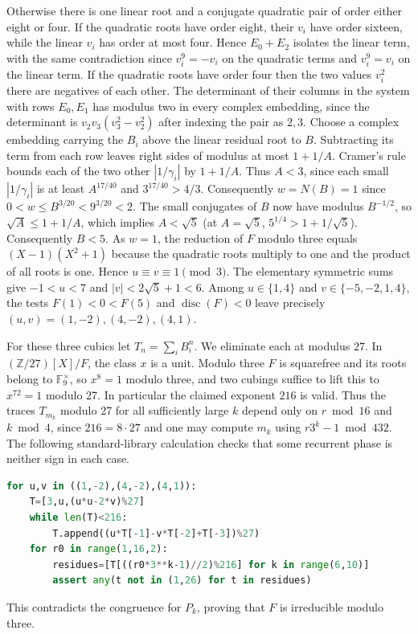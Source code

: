\documentclass[11pt]{article}
\begin{document}
Otherwise there is one linear root and a conjugate quadratic pair of
order either eight or four. If the quadratic roots have order eight,
their $v_i$ have order sixteen, while the linear $v_i$ has order at
most four. Hence $E_0+E_2$ isolates the linear term, with the same
contradiction since $v_i^9=-v_i$ on the quadratic terms and $v_i^9=v_i$ on the linear term. If the quadratic roots have order four then the two
values $v_i^2$ there are negatives of each other. The determinant of
their columns in the system with rows $E_0,E_1$ has modulus two
in every complex embedding, since the determinant is $v_2v_3(v_3^2-v_2^2)$ after indexing the pair as $2,3$. Choose a complex embedding carrying the $B_i$ above the linear residual root to $B$. Subtracting its term from each row leaves right sides of modulus at most $1+1/A$. Cramer's rule
bounds each of the two other $|1/\gamma_i|$ by $1+1/A$.
Thus $A<3$, since each small $|1/\gamma_i|$ is at least $A^{17/40}$
and $3^{17/40}>4/3$. Consequently $w=N(B)=1$ since
$0<w\le B^{3/20}<9^{3/20}<2$. The small conjugates
of $B$ now have modulus $B^{-1/2}$, so $\sqrt A\le1+1/A$, which implies $A<\sqrt5$ (at $A=\sqrt5$, $5^{1/4}>1+1/\sqrt5$).
Consequently $B<5$. As $w=1$, the reduction of $F$ modulo three equals
$(X-1)(X^2+1)$ because the quadratic roots multiply to one and the
product of all roots is one. Hence $u\equiv v\equiv1\pmod3$.
The elementary symmetric sums give $-1<u<7$ and
$|v|<2\sqrt5+1<6$. Among $u\in\{1,4\}$ and
$v\in\{-5,-2,1,4\}$, the tests $F(1)<0<F(5)$ and
$\operatorname{disc}(F)<0$ leave precisely
$(u,v)=(1,-2),(4,-2),(4,1)$.

For these three cubics let $T_n=\sum_i B_i^n$. We eliminate each at modulus $27$. In $(\mathbb Z/27)[X]/F$, the
class $x$ is a unit. Modulo three $F$ is squarefree
and its roots belong to $\mathbb F_9^\times$, so $x^8=1$ modulo
three, and two cubings suffice to lift this to $x^{72}=1$ modulo
27. In particular the claimed exponent $216$ is valid. Thus the
traces $T_{m_k}$ modulo 27 for all sufficiently large $k$ depend
only on $r\bmod16$ and $k\bmod4$, since $216=8\cdot27$ and one may
compute $m_k$ using $r3^k-1\bmod432$. The following standard-library
calculation checks that some recurrent phase is neither sign in each case.
\begin{lstlisting}[language=Python]
for u,v in ((1,-2),(4,-2),(4,1)):
    T=[3,u,(u*u-2*v)%27]
    while len(T)<216:
        T.append((u*T[-1]-v*T[-2]+T[-3])%27)
    for r0 in range(1,16,2):
        residues=[T[((r0*3**k-1)//2)%216] for k in range(6,10)]
        assert any(t not in (1,26) for t in residues)
\end{lstlisting}
This contradicts the congruence for $P_k$, proving that $F$ is
irreducible modulo three.
\end{document}
